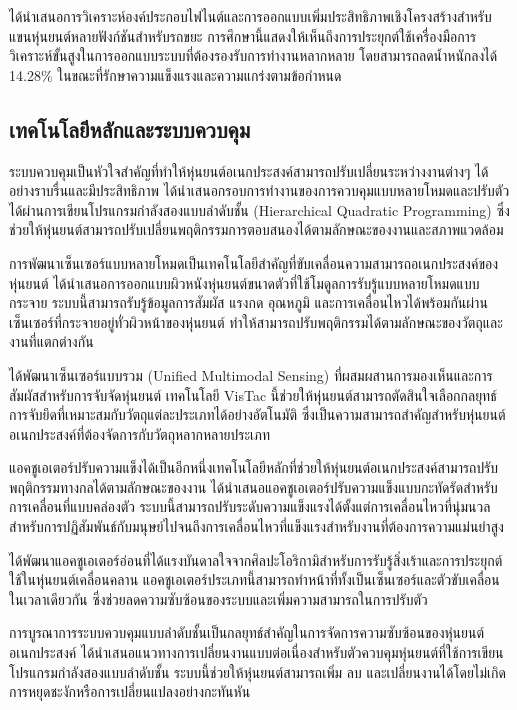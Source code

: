 \documentclass[a4paper]{article}
\begin{document}
\textcite{li2025finite} ได้นำเสนอการวิเคราะห์องค์ประกอบไฟไนต์และการออกแบบเพิ่มประสิทธิภาพเชิงโครงสร้างสำหรับแขนหุ่นยนต์หลายฟังก์ชันสำหรับรถขยะ การศึกษานี้แสดงให้เห็นถึงการประยุกต์ใช้เครื่องมือการวิเคราะห์ขั้นสูงในการออกแบบระบบที่ต้องรองรับการทำงานหลากหลาย โดยสามารถลดน้ำหนักลงได้ 14.28\% ในขณะที่รักษาความแข็งแรงและความแกร่งตามข้อกำหนด

\subsection{เทคโนโลยีหลักและระบบควบคุม}

ระบบควบคุมเป็นหัวใจสำคัญที่ทำให้หุ่นยนต์อเนกประสงค์สามารถปรับเปลี่ยนระหว่างงานต่างๆ ได้อย่างราบรื่นและมีประสิทธิภาพ \textcite{tassi2024multimodal} ได้นำเสนอกรอบการทำงานของการควบคุมแบบหลายโหมดและปรับตัวได้ผ่านการเขียนโปรแกรมกำลังสองแบบลำดับชั้น (Hierarchical Quadratic Programming) ซึ่งช่วยให้หุ่นยนต์สามารถปรับเปลี่ยนพฤติกรรมการตอบสนองได้ตามลักษณะของงานและสภาพแวดล้อม

การพัฒนาเซ็นเซอร์แบบหลายโหมดเป็นเทคโนโลยีสำคัญที่ขับเคลื่อนความสามารถอเนกประสงค์ของหุ่นยนต์ \textcite{yang2024body} ได้นำเสนอการออกแบบผิวหนังหุ่นยนต์ขนาดตัวที่ใช้โมดูลการรับรู้แบบหลายโหมดแบบกระจาย ระบบนี้สามารถรับรู้ข้อมูลการสัมผัส แรงกด อุณหภูมิ และการเคลื่อนไหวได้พร้อมกันผ่านเซ็นเซอร์ที่กระจายอยู่ทั่วผิวหน้าของหุ่นยนต์ ทำให้สามารถปรับพฤติกรรมได้ตามลักษณะของวัตถุและงานที่แตกต่างกัน

\textcite{athar2023vistac} ได้พัฒนาเซ็นเซอร์แบบรวม (Unified Multimodal Sensing) ที่ผสมผสานการมองเห็นและการสัมผัสสำหรับการจับจัดหุ่นยนต์ เทคโนโลยี VisTac นี้ช่วยให้หุ่นยนต์สามารถตัดสินใจเลือกกลยุทธ์การจับยึดที่เหมาะสมกับวัตถุแต่ละประเภทได้อย่างอัตโนมัติ ซึ่งเป็นความสามารถสำคัญสำหรับหุ่นยนต์อเนกประสงค์ที่ต้องจัดการกับวัตถุหลากหลายประเภท

แอคชูเอเตอร์ปรับความแข็งได้เป็นอีกหนึ่งเทคโนโลยีหลักที่ช่วยให้หุ่นยนต์อเนกประสงค์สามารถปรับพฤติกรรมทางกลได้ตามลักษณะของงาน \textcite{ieee2024compact} ได้นำเสนอแอคชูเอเตอร์ปรับความแข็งแบบกะทัดรัดสำหรับการเคลื่อนที่แบบคล่องตัว ระบบนี้สามารถปรับระดับความแข็งแรงได้ตั้งแต่การเคลื่อนไหวที่นุ่มนวลสำหรับการปฏิสัมพันธ์กับมนุษย์ไปจนถึงการเคลื่อนไหวที่แข็งแรงสำหรับงานที่ต้องการความแม่นยำสูง

\textcite{jin2021origami} ได้พัฒนาแอคชูเอเตอร์อ่อนที่ได้แรงบันดาลใจจากศิลปะโอริกามิสำหรับการรับรู้สิ่งเร้าและการประยุกต์ใช้ในหุ่นยนต์เคลื่อนคลาน แอคชูเอเตอร์ประเภทนี้สามารถทำหน้าที่ทั้งเป็นเซ็นเซอร์และตัวขับเคลื่อนในเวลาเดียวกัน ซึ่งช่วยลดความซับซ้อนของระบบและเพิ่มความสามารถในการปรับตัว

การบูรณาการระบบควบคุมแบบลำดับชั้นเป็นกลยุทธ์สำคัญในการจัดการความซับซ้อนของหุ่นยนต์อเนกประสงค์ \textcite{ieee2019continuous} ได้นำเสนอแนวทางการเปลี่ยนงานแบบต่อเนื่องสำหรับตัวควบคุมหุ่นยนต์ที่ใช้การเขียนโปรแกรมกำลังสองแบบลำดับชั้น ระบบนี้ช่วยให้หุ่นยนต์สามารถเพิ่ม ลบ และเปลี่ยนงานได้โดยไม่เกิดการหยุดชะงักหรือการเปลี่ยนแปลงอย่างกะทันหัน
\end{document}
